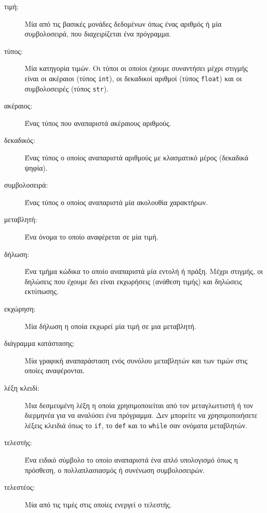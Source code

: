 \documentclass[10pt]{book}
\begin{document}
\begin{description}

\item[τιμή:]  Μία από τις βασικές μονάδες δεδομένων όπως ένας
	αριθμός ή μία συμβολοσειρά, που διαχειρίζεται ένα πρόγραμμα.

\item[τύπος:] Μία κατηγορία τιμών. Οι τύποι οι οποίοι έχουμε συναντήσει
	μέχρι στιγμής είναι οι ακέραιοι (τύπος  {\tt int}), οι δεκαδικοί
	αριθμοί (τύπος {\tt float}) και οι συμβολοσειρές (τύπος {\tt str}).

\item[ακέραιος:] Ένας τύπος που αναπαριστά ακέραιους αριθμούς.

\item[δεκαδικός:] Ένας τύπος ο οποίος αναπαριστά αριθμούς με κλασματικό
	μέρος (δεκαδικά ψηφία).

\item[συμβολοσειρά:] Ένας τύπος ο οποίος αναπαριστά μία ακολουθία χαρακτήρων.

\item[μεταβλητή:]  Ένα όνομα το οποίο αναφέρεται σε μία τιμή.

\item[δήλωση:]  Ένα τμήμα κώδικα το οποίο αναπαριστά μία εντολή ή πράξη.  
	Μέχρι στιγμής, οι δηλώσεις που έχουμε δει είναι εκχωρήσεις (ανάθεση τιμής)
	και δηλώσεις εκτύπωσης.

\item[εκχώρηση:] Μία δήλωση η οποία εκχωρεί μία τιμή σε μια μεταβλητή.

\item[διάγραμμα κατάστασης:] Μία γραφική αναπαράσταση ενός συνόλου μεταβλητών
	και των τιμών στις οποίες αναφέρονται.

\item[λέξη κλειδί:] Μια δεσμευμένη λέξη η οποία χρησιμοποιείται από τον
	μεταγλωττιστή ή τον διερμηνέα για να αναλύσει ένα πρόγραμμα. Δεν μπορείτε να 
    χρησιμοποιήσετε λέξεις κλειδιά όπως το {\tt if}, το {\tt  def} και το {\tt while}
	σαν ονόματα μεταβλητών.

\item[τελεστής:] Ένα ειδικό σύμβολο το οποίο αναπαριστά ένα απλό υπολογισμό όπως
	η πρόσθεση, ο πολλαπλασιασμός ή συνένωση συμβολοσειρών.

\item[τελεστέος:] Μία από τις τιμές στις οποίες ενεργεί ο τελεστής.


\end{description}
\end{document}
